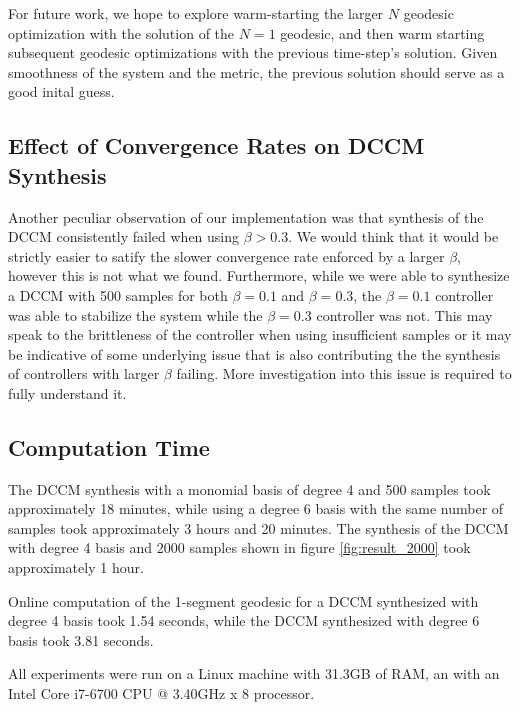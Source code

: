 \documentclass[journal]{IEEEtran}
\begin{document}
For future work, we hope to explore warm-starting the larger $N$ geodesic optimization with the solution of the $N=1$ geodesic, and then warm starting subsequent geodesic optimizations with the previous time-step's solution. Given smoothness of the system and the metric, the previous solution should serve as a good inital guess.

\subsection{Effect of Convergence Rates on DCCM Synthesis}
Another peculiar observation of our implementation was that synthesis of the DCCM consistently failed when using $\beta > 0.3$. We would think that it would be strictly easier to satify the slower convergence rate enforced by a larger $\beta$, however this is not what we found. Furthermore, while we were able to synthesize a DCCM with 500 samples for both $\beta = 0.1$ and $\beta = 0.3$, the $\beta = 0.1$ controller was able to stabilize the system while the $\beta = 0.3$ controller was not. This may speak to the brittleness of the controller when using insufficient samples or it may be indicative of some underlying issue that is also contributing the the synthesis of controllers with larger $\beta$ failing. More investigation into this issue is required to fully understand it.

\subsection{Computation Time}
The DCCM synthesis with a monomial basis of degree 4 and 500 samples took approximately 18 minutes, while using a degree 6 basis with the same number of samples took approximately 3 hours and 20 minutes. The synthesis of the DCCM with degree 4 basis and 2000 samples shown in figure \ref{fig:result_2000} took approximately 1 hour.

Online computation of the 1-segment geodesic for a DCCM synthesized with degree 4 basis took 1.54 seconds, while the DCCM synthesized with degree 6 basis took 3.81 seconds.

All experiments were run on a Linux machine with 31.3GB of RAM, an with an Intel Core i7-6700 CPU @ 3.40GHz x 8 processor.
\end{document}
